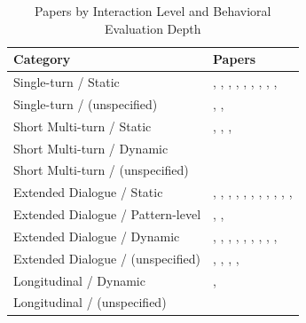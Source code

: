\begin{table}[tbp]
\centering
\small
\begin{tabular}{p{5.5cm}p{9.5cm}}
\toprule
\textbf{Category} & \textbf{Papers} \\
\midrule
Single-turn / Static & \cite{Berrezueta-Guzman2024Future}, \cite{Fouda2026PsychiatryBench}, \cite{Gabriel2024Can}, \cite{Haydarov2025Towards}, \cite{Hu2024PsycoLLM}, \cite{Liu2023ChatCounselor}, \cite{Na2024CBT-LLM}, \cite{Samuel2025PersonaGym}, \cite{Xu2025MentalChat16K}, \cite{Zhang2025CBT-BENCH} \\
\midrule
Single-turn / (unspecified) & \cite{Kermani2025Systematic}, \cite{Nguyen2025Do}, \cite{Sharma2023Cognitive} \\
\midrule
Short Multi-turn / Static & \cite{Aghakhani2025From}, \cite{Basar2024To}, \cite{Basar2025How}, \cite{Cai2026Exploring} \\
\midrule
Short Multi-turn / Dynamic & \cite{Jaiswal2024Building} \\
\midrule
Short Multi-turn / (unspecified) & \cite{Kuhail2025Human-Human} \\
\midrule
Extended Dialogue / Static & \cite{Chen2023LLM-empowered}, \cite{Kang2024Can}, \cite{Lee2024CACTUS}, \cite{Liu2025Eeyore}, \cite{Louie2024Roleplay-doh}, \cite{Ozgun2025Trustworthy}, \cite{Qiu2026PsyCLIENT}, \cite{Schmidgall2025AgentClinic}, \cite{Wang2024PATIENT}, \cite{Wang2025CARE-Bench}, \cite{Xiao2024HealMe}, \cite{Xie2025PsyDT} \\
\midrule
Extended Dialogue / Pattern-level & \cite{Schmidmaier2025Using}, \cite{Schmidmaier2025UsingNonverbal}, \cite{Xu2025MultiAgentESC} \\
\midrule
Extended Dialogue / Dynamic & \cite{Chen2025MIND}, \cite{Feng2025Reframe}, \cite{Kim2025Can}, \cite{Kim2025KMI}, \cite{Kim2025MIRROR}, \cite{Sungarda2025GenAI}, \cite{Wang2025AnnaAgent}, \cite{Wang2025Feel}, \cite{Yang2025CAMI}, \cite{Yang2025Consistent} \\
\midrule
Extended Dialogue / (unspecified) & \cite{Chiu2024A}, \cite{Deshpande2025Evaluating}, \cite{Louie2026Can}, \cite{Tanana2019Development}, \cite{Wang2024Towards} \\
\midrule
Longitudinal / Dynamic & \cite{Qiu2025EmoAgent}, \cite{Wang2025Psychological} \\
\midrule
Longitudinal / (unspecified) & \cite{Li2024Understanding} \\

\bottomrule
\end{tabular}
\caption{Papers by Interaction Level and Behavioral Evaluation Depth}
\label{tab:interaction-behavior-cite}
\end{table}

